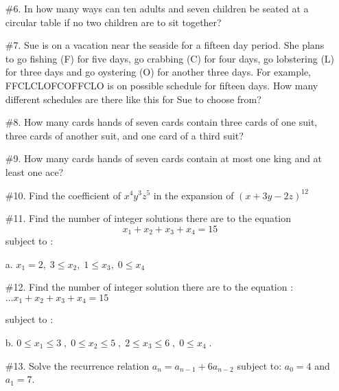 \documentclass[10pt,letterpaper]{article}
\begin{document}
\newpage{}
{

\begin{enumerate}
    \item[\#6.] In how many ways can ten adults and seven children be seated at a circular table if no two children are to sit together?
    \vspace{4em}
    
    \item[\#7.] Sue is on a vacation near the seaside for a fifteen day period. She plans to go fishing (F) for five days, go crabbing (C) for four days, go lobstering (L) for three days and go oystering (O) for another three days. For example, FFCLCLOFCOFFCLO is on possible schedule for fifteen days. How many different schedules are there like this for Sue to choose from?
    \vspace{4em}
    
    \item[\#8.] How many cards hands of seven cards contain three cards of one suit, three cards of another suit, and one card of a third suit?
    \vspace{4em}
    
    \item[\#9.] How many cards hands of seven cards contain at most one king and at least one ace?
    \vspace{4em}
    
    \item[\#10.] Find the coefficient of $x^{4} y^{3} z^{5}$ in the expansion of $(x + 3y -2z)^{12}$
    \vspace{4em}
    
    \item[\#11.] Find the number of integer solutions there are to the equation $$x_{1} + x_{2} + x_{3} + x_{4} = 15 $$
    subject to : 
    
    a. $x_{1} = 2, \; 3\leq x_{2}, \; 1\leq x_{3}, \; 0\leq x_{4}$

\end{enumerate}
}
\newpage{}
{

\begin{enumerate}
    \item[\#12.] Find the number of integer solution there are to the equation : $\dots x_{1} + x_{2} + x_{3} + x_{4}  = 15$
    
    subject to :
    
    b. $0 \leq x_{1} \leq 3 \; ,\;   0 \leq x_{2} \leq 5\; ,\;  2 \leq x_{3} \leq 6 \;,\; 0 \leq x_{4}\;$.
    \vspace{25em}
    
    \item[\#13.]
    Solve the recurrence relation $a_{n} = a_{n-1} + 6a_{n-2}$ subject to: $a_{0} = 4$ and $a_{1} = 7$.
    

\end{enumerate}
}
\end{document}
